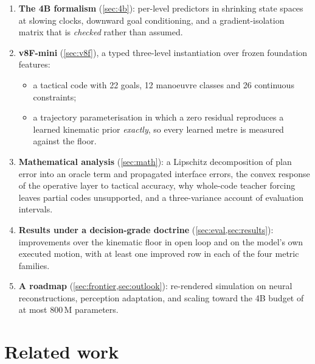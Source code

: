 \documentclass[10pt,twocolumn]{article}
\makeatletter
\theoremstyle{remark}
\renewcommand\paragraph{\@startsection{paragraph}{4}{\z@}{1.6ex \@plus .5ex \@minus .2ex}{-1em}{\normalfont\normalsize\bfseries}}
\makeatother
\begin{document}
\paragraph{Contributions.}
\begin{enumerate}[label=(\roman*)]
  \item \textbf{The 4B formalism} (\cref{sec:4b}): per-level predictors in shrinking state spaces at slowing clocks, downward goal
        conditioning, and a gradient-isolation matrix that is \emph{checked} rather than assumed.
  \item \textbf{v8F-mini} (\cref{sec:v8f}), a typed three-level instantiation over frozen foundation features:
        \begin{itemize}
          \item a tactical code with 22 goals, 12 manoeuvre classes and 26 continuous constraints;
          \item a trajectory parameterisation in which a zero residual reproduces a learned kinematic prior \emph{exactly}, so every
                learned metre is measured against the floor.
        \end{itemize}
  \item \textbf{Mathematical analysis} (\cref{sec:math}): a Lipschitz decomposition of plan error into an oracle term and propagated
        interface errors, the convex response of the operative layer to tactical accuracy, why whole-code teacher forcing leaves
        partial codes unsupported, and a three-variance account of evaluation intervals.
  \item \textbf{Results under a decision-grade doctrine} (\cref{sec:eval,sec:results}): improvements over the kinematic floor in open
        loop and on the model's own executed motion, with at least one improved row in each of the four metric families.
  \item \textbf{A roadmap} (\cref{sec:frontier,sec:outlook}): re-rendered simulation on neural reconstructions, perception adaptation,
        and scaling toward the 4B budget of at most 800\,M parameters.
\end{enumerate}

\section{Related work}
\end{document}
